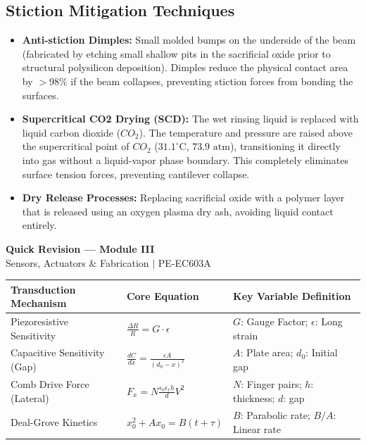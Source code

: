 \documentclass[12pt,a4paper]{article}
\renewcommand{\arraystretch}{1.45}
\begin{document}
\subsection{Stiction Mitigation Techniques}
\begin{itemize}[leftmargin=*, itemsep=4pt]
  \item \textbf{Anti-stiction Dimples:} Small molded bumps on the underside of the beam (fabricated by etching small shallow pits in the sacrificial oxide prior to structural polysilicon deposition). Dimples reduce the physical contact area by $>98\%$ if the beam collapses, preventing stiction forces from bonding the surfaces.
  \item \textbf{Supercritical CO2 Drying (SCD):} The wet rinsing liquid is replaced with liquid carbon dioxide ($CO_2$). The temperature and pressure are raised above the supercritical point of $CO_2$ ($31.1^{\circ}\text{C}$, $73.9\text{ atm}$), transitioning it directly into gas without a liquid-vapor phase boundary. This completely eliminates surface tension forces, preventing cantilever collapse.
  \item \textbf{Dry Release Processes:} Replacing sacrificial oxide with a polymer layer that is released using an oxygen plasma dry ash, avoiding liquid contact entirely.
\end{itemize}

\newpage
\begin{center}
  {\large\bfseries\color{myred} Quick Revision --- Module III}\\[3pt]
  {\small\color{mydark} Sensors, Actuators \& Fabrication $|$ PE-EC603A}
\end{center}
\noindent{\color{myred}\rule{\linewidth}{1.2pt}}
\vspace{4pt}

\begin{tcolorbox}[formulabox, title={\textbf{Key Transduction Formulas}}]
\renewcommand{\arraystretch}{1.3}
\begin{tabularx}{\linewidth}{B{3.8cm} Y Y}
\textbf{Transduction Mechanism} & \textbf{Core Equation} & \textbf{Key Variable Definition} \\
\hline
Piezoresistive Sensitivity & $\displaystyle\frac{\Delta R}{R} = G \cdot \epsilon$ & $G$: Gauge Factor; $\epsilon$: Long strain \\[8pt]
Capacitive Sensitivity (Gap) & $\displaystyle\frac{dC}{dx} = \frac{\epsilon A}{(d_0 - x)^2}$ & $A$: Plate area; $d_0$: Initial gap \\[8pt]
Comb Drive Force (Lateral) & $\displaystyle F_x = N \frac{\epsilon_0 \epsilon_r h}{d} V^2$ & $N$: Finger pairs; $h$: thickness; $d$: gap \\[8pt]
Deal-Grove Kinetics & $x_0^2 + A x_0 = B(t + \tau)$ & $B$: Parabolic rate; $B/A$: Linear rate \\[2pt]
\end{tabularx}
\end{tcolorbox}
\end{document}
